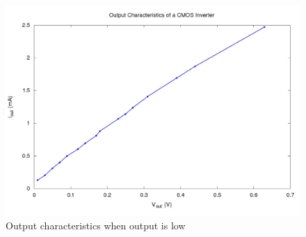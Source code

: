 \documentclass[12pt]{article}
\begin{document}
\begin{figure}[t]
    \centering
    \includegraphics[scale = .40]{figs/When_input_High.jpg}
    \caption{Output characteristics when output is low}
    \label{fig:my_label}
\end{figure}
\end{document}
